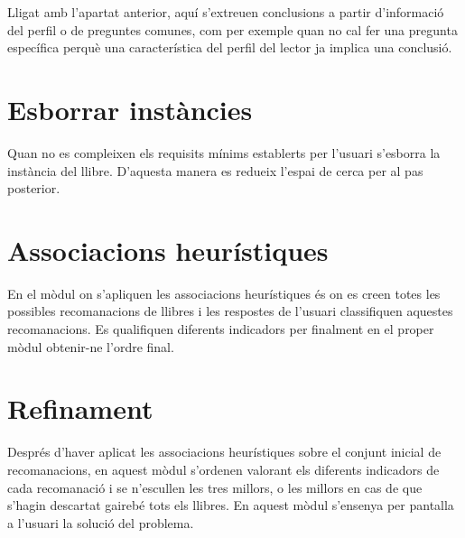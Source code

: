 Lligat amb l'apartat anterior, aquí s'extreuen conclusions a partir d'informació del perfil o de preguntes comunes, com per exemple quan no cal fer una pregunta específica perquè una característica del perfil del lector ja implica una conclusió.

\section{Esborrar instàncies}

Quan no es compleixen els requisits mínims establerts per l'usuari s'esborra la instància del llibre. D'aquesta manera es redueix l'espai de cerca per al pas posterior.

\section{Associacions heurístiques}

En el mòdul on s'apliquen les associacions heurístiques és on es creen totes les possibles recomanacions de llibres i les respostes de l'usuari classifiquen aquestes recomanacions. Es qualifiquen diferents indicadors per finalment en el proper mòdul obtenir-ne l'ordre final.

\section{Refinament}

Després d'haver aplicat les associacions heurístiques sobre el conjunt inicial de recomanacions, en aquest mòdul s'ordenen valorant els diferents indicadors de cada recomanació i se n'escullen les tres millors, o les millors en cas de que s'hagin descartat gairebé tots els llibres. En aquest mòdul s'ensenya per pantalla a l'usuari la solució del problema.
